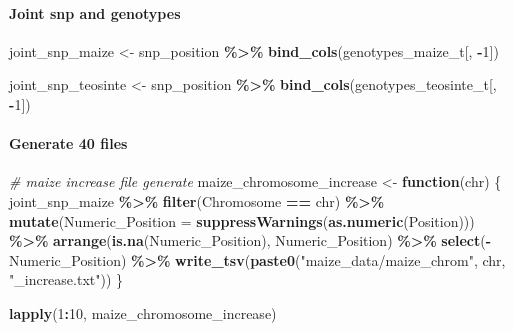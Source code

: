 \documentclass[
]{article}
\newenvironment{Shaded}{\begin{snugshade}}{\end{snugshade}}
\newcommand{\AttributeTok}[1]{\textcolor[rgb]{0.13,0.29,0.53}{#1}}
\newcommand{\CommentTok}[1]{\textcolor[rgb]{0.56,0.35,0.01}{\textit{#1}}}
\newcommand{\ControlFlowTok}[1]{\textcolor[rgb]{0.13,0.29,0.53}{\textbf{#1}}}
\newcommand{\DecValTok}[1]{\textcolor[rgb]{0.00,0.00,0.81}{#1}}
\newcommand{\FunctionTok}[1]{\textcolor[rgb]{0.13,0.29,0.53}{\textbf{#1}}}
\newcommand{\NormalTok}[1]{#1}
\newcommand{\OtherTok}[1]{\textcolor[rgb]{0.56,0.35,0.01}{#1}}
\newcommand{\SpecialCharTok}[1]{\textcolor[rgb]{0.81,0.36,0.00}{\textbf{#1}}}
\newcommand{\StringTok}[1]{\textcolor[rgb]{0.31,0.60,0.02}{#1}}
\begin{document}
\paragraph{Joint snp and genotypes}\label{joint-snp-and-genotypes}

\begin{Shaded}
\begin{Highlighting}[]
\NormalTok{joint\_snp\_maize }\OtherTok{\textless{}{-}}\NormalTok{ snp\_position }\SpecialCharTok{\%\textgreater{}\%}
  \FunctionTok{bind\_cols}\NormalTok{(genotypes\_maize\_t[, }\SpecialCharTok{{-}}\DecValTok{1}\NormalTok{])}

\NormalTok{joint\_snp\_teosinte }\OtherTok{\textless{}{-}}\NormalTok{ snp\_position }\SpecialCharTok{\%\textgreater{}\%} 
  \FunctionTok{bind\_cols}\NormalTok{(genotypes\_teosinte\_t[, }\SpecialCharTok{{-}}\DecValTok{1}\NormalTok{])}
\end{Highlighting}
\end{Shaded}

\paragraph{Generate 40 files}\label{generate-40-files}

\begin{Shaded}
\begin{Highlighting}[]
\CommentTok{\# maize increase file generate}
\NormalTok{maize\_chromosome\_increase }\OtherTok{\textless{}{-}} \ControlFlowTok{function}\NormalTok{(chr) \{}
\NormalTok{  joint\_snp\_maize }\SpecialCharTok{\%\textgreater{}\%}
    \FunctionTok{filter}\NormalTok{(Chromosome }\SpecialCharTok{==}\NormalTok{ chr) }\SpecialCharTok{\%\textgreater{}\%}
    \FunctionTok{mutate}\NormalTok{(}\AttributeTok{Numeric\_Position =} \FunctionTok{suppressWarnings}\NormalTok{(}\FunctionTok{as.numeric}\NormalTok{(Position))) }\SpecialCharTok{\%\textgreater{}\%}  
    \FunctionTok{arrange}\NormalTok{(}\FunctionTok{is.na}\NormalTok{(Numeric\_Position), Numeric\_Position) }\SpecialCharTok{\%\textgreater{}\%}  
    \FunctionTok{select}\NormalTok{(}\SpecialCharTok{{-}}\NormalTok{Numeric\_Position) }\SpecialCharTok{\%\textgreater{}\%}
    \FunctionTok{write\_tsv}\NormalTok{(}\FunctionTok{paste0}\NormalTok{(}\StringTok{"maize\_data/maize\_chrom"}\NormalTok{, chr, }\StringTok{"\_increase.txt"}\NormalTok{))}
\NormalTok{\}}

\FunctionTok{lapply}\NormalTok{(}\DecValTok{1}\SpecialCharTok{:}\DecValTok{10}\NormalTok{, maize\_chromosome\_increase)}
\end{Highlighting}
\end{Shaded}
\end{document}

